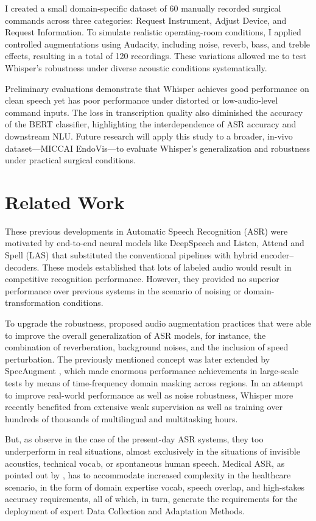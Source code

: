 \documentclass[11pt,a4paper]{article}
\begin{document}
I created a small domain-specific dataset of 60 manually recorded surgical commands across three categories: Request Instrument, Adjust Device, and Request Information. To simulate realistic operating-room conditions, I applied controlled augmentations using Audacity, including noise, reverb, bass, and treble effects, resulting in a total of 120 recordings. These variations allowed me to test Whisper's robustness under diverse acoustic conditions systematically.

Preliminary evaluations demonstrate that Whisper achieves good performance on clean speech yet has poor performance under distorted or low-audio-level command inputs. The loss in transcription quality also diminished the accuracy of the BERT classifier, highlighting the interdependence of ASR accuracy and downstream NLU. Future research will apply this study to a broader, in-vivo dataset—MICCAI EndoVis—to evaluate Whisper's generalization and robustness under practical surgical conditions.


\section{Related Work}
These previous developments in Automatic Speech Recognition (ASR) were motivated by end-to-end neural models like DeepSpeech \cite{hannun2014deepspeech} and Listen, Attend and Spell (LAS) \cite{chan2016las} that substituted the conventional pipelines with hybrid encoder–decoders. These models established that lots of labeled audio would result in competitive recognition performance. However, they provided no superior performance over previous systems in the scenario of noising or domain-transformation conditions.

To upgrade the robustness, \cite{ko2015audioaugment} proposed audio augmentation practices that were able to improve the overall generalization of ASR models, for instance, the combination of reverberation, background noises, and the inclusion of speed perturbation. The previously mentioned concept was later extended by SpecAugment \cite{park2019specaugment}, which made enormous performance achievements in large-scale tests by means of time-frequency domain masking across regions. In an attempt to improve real-world performance as well as noise robustness, Whisper \cite{pmlr-v202-radford23a} more recently benefited from extensive weak supervision as well as training over hundreds of thousands of multilingual and multitasking hours.

But, as \cite{alharbi2021asrreview} observe in the case of the present-day ASR systems, they too underperform in real situations, almost exclusively in the situations of invisible acoustics, technical vocab, or spontaneous human speech. Medical ASR, as pointed out by \cite{deepa2022speechhealthcare}, has to accommodate increased complexity in the healthcare scenario, in the form of domain expertise vocab, speech overlap, and high-stakes accuracy requirements, all of which, in turn, generate the requirements for the deployment of expert Data Collection and Adaptation Methods.
\end{document}
